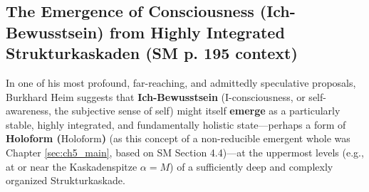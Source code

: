 \documentclass[
    12pt,              %
    a4paper,           %
    headings=normal,   %
    twoside=true,      %
    BCOR=8mm,          %
]{scrbook}
\newcommand{\holoform}{\text{Holoform}}
\newcommand{\kaskadenstufe}{\alpha}
\begin{document}
\subsection{The Emergence of Consciousness (Ich-Bewusstsein) from Highly Integrated Strukturkaskaden (SM p. 195 context)}
\label{sec:ch9_4_3_emergence_consciousness}
In one of his most profound, far-reaching, and admittedly speculative proposals, Burkhard Heim suggests that \textbf{Ich-Bewusstsein} (I-consciousness, or self-awareness, the subjective sense of self) might itself \textbf{emerge} as a particularly stable, highly integrated, and fundamentally holistic state—perhaps a form of \textbf{Holoform (\(\holoform\))} (as this concept of a non-reducible emergent whole was Chapter \ref{sec:ch5_main}, based on SM Section 4.4)—at the uppermost levels (e.g., at or near the Kaskadenspitze \(\kaskadenstufe=M\)) of a sufficiently deep and complexly organized Strukturkaskade.
\end{document}
